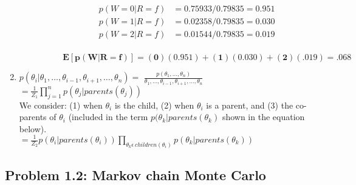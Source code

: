 \documentclass{article}
\begin{document}
\begin{enumerate}[label=(\alph*)]
\begin{enumerate}[label=\roman*.]
\begin{enumerate}[label=\alph*.]
\begin{itemize}
\begin{align*}
p(W=0|R=f)&=0.75933/0.79835=0.951 \\
p(W=1|R=f)&=0.02358/0.79835=0.030 \\
p(W=2|R=f)&=0.01544/0.79835=0.019 \\
\end{align*}

$\bm{E[p(W|R=f)]=(0)(0.951)+(1)(0.030)+(2)(.019)=.068}$

\end{itemize}

\end{enumerate}

\end{enumerate}


\item

$p(\theta_i|\theta_1,\text{\ldots},\theta_{i-1},\theta_{i+1},\text{\ldots},\theta_n) = $ 
$\frac{p(\theta_1, \text{\ldots}, \theta_n)} {\theta_1,\text{\ldots},\theta_{i-1},\theta_{i+1},\text{\ldots},\theta_n}$ 
$= \frac{1}{Z_1}\prod_{j=1}^n p(\theta_j|parents(\theta_j))$ \\


We consider: (1) when $\theta_i$ is the child, (2) when $\theta_i$ is a parent, and 
(3) the co-parents of $\theta_i$ (included in the term $p(\theta_k|parents(\theta_k)$ shown in the equation below). \\

$= \frac{1}{Z_2}p(\theta_i|parents(\theta_i)) \prod_{\theta_k \epsilon \, children{(\theta_i)}}p(\theta_k|parents(\theta_k))$



\end{enumerate}

\subsection*{Problem 1.2: Markov chain Monte Carlo}

\end{document}
